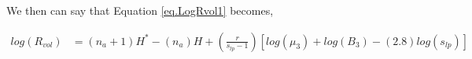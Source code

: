 \documentclass[12pt,letterpaper]{article}
\newcommand{\lr}[1]{\left( #1 \right)}
\newcommand{\lrb}[1]{\left[ #1 \right]}
\begin{document}
We then can say that Equation \ref{eq.LogRvol1} becomes,

\begin{align}
log
\lr{
    R_{vol}
}
&=
\lr{n_a+1}   
H^{*}
-
\lr{n_a}
H
+
\lr{
    \frac{
        r
    }{
        s_{lp}-1
    }
}
\lrb{
    log
    \lr{
        \mu_3
    }
    +
    log
    \lr{
    B_3
    }            
    -
    \lr{2.8}
    log
    \lr{
        s_{lp}
    }
}
\end{align}







\newpage

\end{document}
